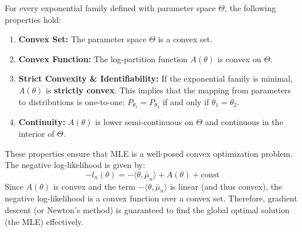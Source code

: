 \begin{thm}
    For every exponential family defined with parameter space $\Theta$, the following properties hold:
\begin{enumerate}
    \item \textbf{Convex Set:} The parameter space $\Theta$ is a convex set.
    \item \textbf{Convex Function:} The log-partition function $A(\theta)$ is convex on $\Theta$.
    \item \textbf{Strict Convexity \& Identifiability:} If the exponential family is minimal, $A(\theta)$ is \textbf{strictly convex}. This implies that the mapping from parameters to distributions is one-to-one: $P_{\theta_1} = P_{\theta_2}$ if and only if $\theta_1 = \theta_2$.
    \item \textbf{Continuity:} $A(\theta)$ is lower semi-continuous on $\Theta$ and continuous in the interior of $\Theta$.
\end{enumerate}
\end{thm}


\begin{eg}
    These properties ensure that MLE is a well-posed convex optimization problem. The negative log-likelihood is given by:
\begin{equation}
    -l_n(\theta) = -\langle \theta, \bar{\mu}_n \rangle + A(\theta) + \text{const}
\end{equation}
Since $A(\theta)$ is convex and the term $-\langle \theta, \bar{\mu}_n \rangle$ is linear (and thus convex), the negative log-likelihood is a convex function over a convex set. Therefore, gradient descent (or Newton's method) is guaranteed to find the global optimal solution (the MLE) effectively.
\end{eg}


